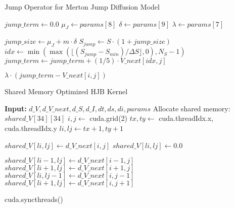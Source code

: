 \documentclass[onecolumn,ieee]{arithmaxresearch}
\begin{document}
\begin{onecolumn}
\begin{algorithm}
\caption{Jump Operator for Merton Jump Diffusion Model}
\begin{algorithmic}[1]
    \State $jump\_term \gets 0.0$
    \State $\mu_J \gets params[8]$ 
    \State $\delta \gets params[9]$ 
    \State $\lambda \gets params[7]$ 
    
     
        \State $jump\_size \gets \mu_J + m \cdot \delta$
        \State $S_{jump} \gets S \cdot (1 + jump\_size)$
        \State $idx \gets \min(\max(\lfloor(S_{jump} - S_{min})/\Delta S\rfloor, 0), N_S-1)$
        \State $jump\_term \gets jump\_term + (1/5) \cdot V\_next[idx,j]$
    \EndFor
    
    \State \Return $\lambda \cdot (jump\_term - V\_next[i,j])$ 
\EndFunction
\end{algorithmic}
\end{algorithm}


\begin{algorithm}
\caption{Shared Memory Optimized HJB Kernel}
\begin{algorithmic}[1]
\State \textbf{Input:} $d\_V, d\_V\_next, d\_S, d\_I, dt, ds, di, params$
\State Allocate shared memory: $shared\_V[34][34]$ 
\State $i, j \gets$ cuda.grid(2)
\State $tx, ty \gets$ cuda.threadIdx.x, cuda.threadIdx.y
\State $li, lj \gets tx + 1, ty + 1$ 

\State {}
    \State $shared\_V[li, lj] \gets d\_V\_next[i, j]$
\Else
    \State $shared\_V[li, lj] \gets 0.0$
\EndIf

\State {}
 
    \State $shared\_V[li-1, lj] \gets d\_V\_next[i-1, j]$
\EndIf
{} 
    \State $shared\_V[li+1, lj] \gets d\_V\_next[i+1, j]$
\EndIf
{} 
    \State $shared\_V[li, lj-1] \gets d\_V\_next[i, j-1]$
\EndIf
{} 
    \State $shared\_V[li+1, lj] \gets d\_V\_next[i, j+1]$
\EndIf

\State cuda.syncthreads() 


\end{algorithmic}
\end{algorithm}
\end{onecolumn}
\end{document}
